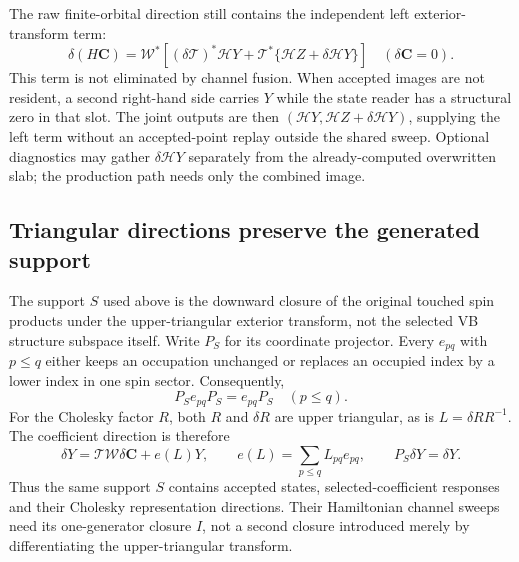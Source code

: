 \documentclass[11pt,a4paper]{article}
\newcommand{\Wa}{\mathcal W}
\newcommand{\Ta}{\mathcal T}
\newcommand{\Ha}{\mathcal H}
\renewcommand{\vv}[1]{\mathbf{#1}}
\begin{document}
The raw finite-orbital direction still contains the independent left
exterior-transform term:
\begin{equation}
 \delta(H\vv C)=\Wa^*\left[
       (\delta\Ta)^*\Ha Y+
       \Ta^*\{\Ha Z+\delta\Ha Y\}\right]
 \quad(\delta\vv C=0).
\end{equation}
This term is not eliminated by channel fusion. When accepted images are
not resident, a second right-hand side carries $Y$ while the state reader
has a structural zero in that slot. The joint outputs are then
$(\Ha Y,\Ha Z+\delta\Ha Y)$, supplying the left term without an
accepted-point replay outside the shared sweep. Optional diagnostics may
gather $\delta\Ha Y$ separately from the already-computed overwritten
slab; the production path needs only the combined image.

\subsection{Triangular directions preserve the generated support}

The support $S$ used above is the downward closure of the original touched
spin products under the upper-triangular exterior transform, not the selected
VB structure subspace itself. Write $P_S$ for its coordinate projector.
Every $e_{pq}$ with $p\le q$ either keeps an occupation unchanged or replaces
an occupied index by a lower index in one spin sector. Consequently,
\begin{equation}
 P_S e_{pq}P_S=e_{pq}P_S\quad(p\le q).
 \label{eq:upper-support-invariance}
\end{equation}
For the Cholesky factor $R$, both $R$ and $\delta R$ are upper triangular,
as is $L=\delta R R^{-1}$. The coefficient direction is therefore
\begin{equation}
 \delta Y=\Ta\Wa\delta\vv C+e(L)Y,\qquad
 e(L)=\sum_{p\le q}L_{pq}e_{pq},\qquad P_S\delta Y=\delta Y.
 \label{eq:upper-support-tangent}
\end{equation}
Thus the same support $S$ contains accepted states, selected-coefficient
responses and their Cholesky representation directions. Their Hamiltonian
channel sweeps need its one-generator closure $I$, not a second closure
introduced merely by differentiating the upper-triangular transform.
\end{document}
